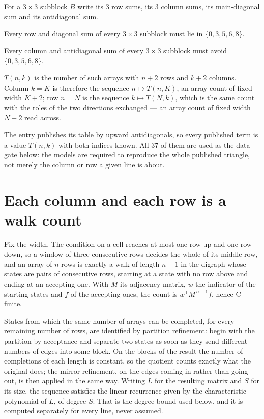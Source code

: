 \documentclass[11pt]{article}
\theoremstyle{definition}
\begin{document}
For a $3\times3$ subblock $B$ write its 3 row sums, its 3 column sums, its main-diagonal sum and its antidiagonal sum.

Every row and diagonal sum of every $3\times3$ subblock must lie in $\{0, 3, 5, 6, 8\}$.

Every column and antidiagonal sum of every $3\times3$ subblock must avoid $\{0, 3, 5, 6, 8\}$.

$T(n,k)$ is the number of such arrays with $n + 2$ rows and $k + 2$ columns. Column $k = K$ is therefore the sequence $n \mapsto T(n,K)$, an array count of fixed width $K + 2$; row $n = N$ is the sequence $k \mapsto T(N,k)$, which is the same count with the roles of the two directions exchanged --- an array count of fixed width $N + 2$ read across.

The entry publishes its table by upward antidiagonals, so every published term is a value $T(n,k)$ with both indices known. All 37 of them are used as the data gate below: the models are required to reproduce the whole published triangle, not merely the column or row a given line is about.

\section{Each column and each row is a walk count}

Fix the width. The condition on a cell reaches at most one row up and one row down, so a window of three consecutive rows decides the whole of its middle row, and an array of $n$ rows is exactly a walk of length $n-1$ in the digraph whose states are pairs of consecutive rows, starting at a state with no row above and ending at an accepting one. With $M$ its adjacency matrix, $w$ the indicator of the starting states and $f$ of the accepting ones, the count is $w^{\mathsf T}M^{\,n-1}f$, hence C-finite.

States from which the same number of arrays can be completed, for every remaining number of rows, are identified by partition refinement: begin with the partition by acceptance and separate two states as soon as they send different numbers of edges into some block. On the blocks of the result the number of completions of each length is constant, so the quotient counts exactly what the original does; the mirror refinement, on the edges coming in rather than going out, is then applied in the same way. Writing $L$ for the resulting matrix and $S$ for its size, the sequence satisfies the linear recurrence given by the characteristic polynomial of $L$, of degree $S$. That is the degree bound used below, and it is computed separately for every line, never assumed.
\end{document}
